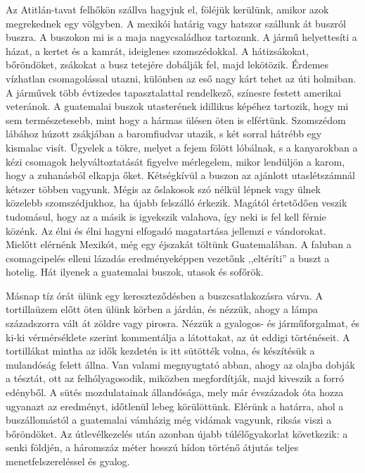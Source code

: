 Az Atitlán-tavat felhőkön szállva hagyjuk el, föléjük kerülünk, amikor
azok megrekednek egy völgyben. A mexikói határig vagy hatszor
szállunk át buszról buszra. A buszokon mi is a maja nagycsaládhoz
tartozunk. A jármű helyettesíti a házat, a kertet és a kamrát, ideiglenes
szomszédokkal. A hátizsákokat, bőröndöket, zsákokat a busz tetejére
dobálják fel, majd lekötözik. Érdemes vízhatlan csomagolással
utazni, különben az eső nagy kárt tehet az úti holmiban. A járművek
több évtizedes tapasztalattal rendelkező, színesre festett amerikai
veteránok. A guatemalai buszok utasterének idillikus képéhez tartozik,
hogy mi sem természetesebb, mint hogy a hármas ülésen öten is elfértünk.
Szomszédom lábához húzott zsákjában a baromfiudvar utazik,
s két sorral hátrébb egy kismalac visít. Ügyelek a tökre, melyet a fejem
fölött lóbálnak, s a kanyarokban a kézi csomagok helyváltoztatását
figyelve mérlegelem, mikor lendüljön a karom, hogy a zuhanásból elkapja
őket. Kétségkívül a buszon az ajánlott utaslétszámnál kétszer többen
vagyunk. Mégis az őslakosok szó nélkül lépnek vagy ülnek közelebb
szomszédjukhoz, ha újabb felszálló érkezik. Magától értetődően veszik
tudomásul, hogy az a másik is igyekszik valahova, így neki is fel
kell férnie közénk. Az élni és élni hagyni elfogadó magatartása jellemzi
e vándorokat. Mielőtt elérnénk Mexikót, még egy éjszakát töltünk
Guatemalában. A faluban a csomagcipelés elleni lázadás eredményeképpen
vezetőnk ,,eltéríti'' a buszt a hotelig. Hát ilyenek a guatemalai
buszok, utasok és sofőrök.

Másnap tíz órát ülünk egy kereszteződésben a buszcsatlakozásra
várva. A tortillaüzem előtt öten ülünk körben a járdán, és nézzük,
ahogy a lámpa századszorra vált át zöldre vagy pirosra. Nézzük a gyalogos-
és járműforgalmat, és ki-ki vérmérséklete szerint kommentálja
a látottakat, az út eddigi történéseit. A tortillákat mintha az idők kezdetén
is itt sütötték volna, és készítésük a mulandóság felett állna. Van
valami megnyugtató abban, ahogy az olajba dobják a tésztát, ott az
felhólyagosodik, miközben megfordítják, majd kiveszik a forró edényből.
A sütés mozdulatainak állandósága, mely már évszázadok óta
hozza ugyanazt az eredményt, időtlenül lebeg körülöttünk. Elérünk
a határra, ahol a buszállomástól a guatemalai vámházig még vidámak
vagyunk, riksás viszi a bőröndöket. Az útlevélkezelés után azonban
újabb túlélőgyakorlat következik: a senki földjén, a háromszáz méter
hosszú hídon történő átjutás teljes menetfelszereléssel és gyalog.

